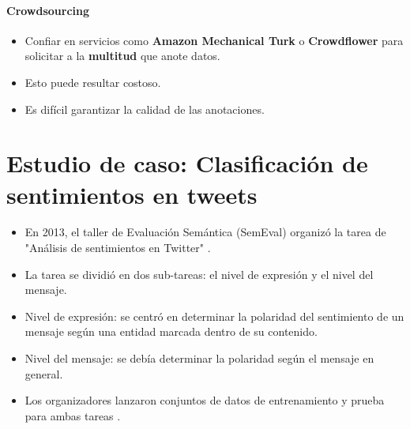 \documentclass{book}
\begin{document}
\paragraph{Crowdsourcing}
\begin{itemize}
   \item Confiar en servicios como \textbf{Amazon Mechanical Turk} o \textbf{Crowdflower} para solicitar a la \textbf{multitud} que anote datos.
   \item Esto puede resultar costoso.
   \item Es difícil garantizar la calidad de las anotaciones.
\end{itemize}

\section{Estudio de caso: Clasificación de sentimientos en tweets}

\begin{itemize}
   \item En 2013, el taller de Evaluación Semántica (SemEval) organizó la tarea de "Análisis de sentimientos en Twitter" \cite{Semeval2013}.
   \item La tarea se dividió en dos sub-tareas: el nivel de expresión y el nivel del mensaje.
   \item Nivel de expresión: se centró en determinar la polaridad del sentimiento de un mensaje según una entidad marcada dentro de su contenido.
   \item Nivel del mensaje: se debía determinar la polaridad según el mensaje en general.
   \item Los organizadores lanzaron conjuntos de datos de entrenamiento y prueba para ambas tareas \cite{Semeval2013}.
\end{itemize}
\end{document}
